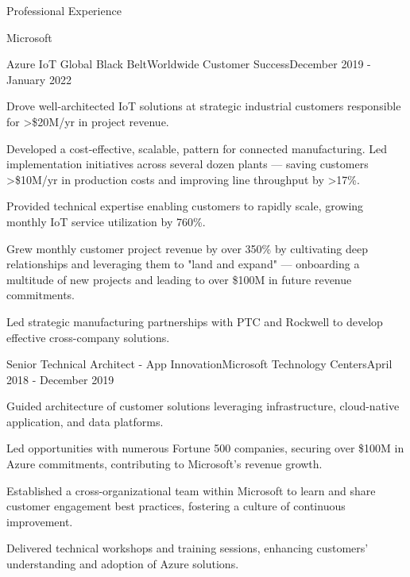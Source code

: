 \documentclass{resume} %
\begin{document}
\begin{rSection}{Professional Experience}
\begin{rCompany}{Microsoft}{}{}
    \begin{rSubSubsection}{Azure IoT Global Black Belt}{Worldwide Customer Success}{December 2019 - January 2022}
        \item Drove well-architected IoT solutions at strategic industrial customers responsible for >\$20M/yr in project revenue. 
        \item Developed a cost-effective, scalable, pattern for connected manufacturing. Led implementation initiatives across several dozen plants --- saving customers >\$10M/yr in production costs and improving line throughput by >17\%. 
        \item Provided technical expertise enabling customers to rapidly scale, growing monthly IoT service utilization by 760\%.
        \item Grew monthly customer project revenue by over 350\% by cultivating deep relationships and leveraging them to "land and expand" --- onboarding a multitude of new projects and leading to over \$100M in future revenue commitments.\
        \item Led strategic manufacturing partnerships with PTC and Rockwell to develop effective cross-company solutions.
    \end{rSubSubsection}
    
    \begin{rSubSubsection}{Senior Technical Architect - App Innovation}{Microsoft Technology Centers}{April 2018 - December 2019}
        \item Guided architecture of customer solutions leveraging infrastructure, cloud-native application, and data platforms.
        \item Led opportunities with numerous Fortune 500 companies, securing over \$100M in Azure commitments, contributing to Microsoft's revenue growth.
        \item Established a cross-organizational team within Microsoft to learn and share customer engagement best practices, fostering a culture of continuous improvement.
        \item Delivered technical workshops and training sessions, enhancing customers' understanding and adoption of Azure solutions.
    \end{rSubSubsection}
  \end{rCompany}


\end{rSection}
\end{document}

